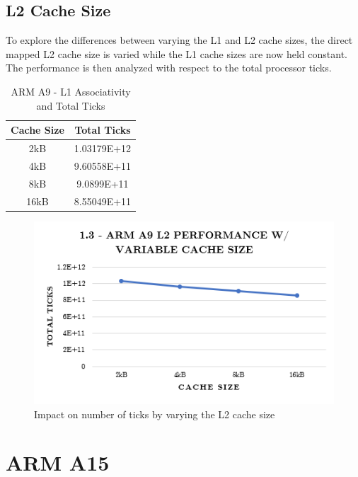 \documentclass[a4paper, 10pt, conference]{ieeeconf}      %
\begin{document}
\subsection{L2 Cache Size}

To explore the differences between varying the L1 and L2 cache sizes, the direct mapped L2 cache size is varied while the L1 cache sizes are now held constant. The performance is then analyzed with respect to the total processor ticks.


\begin{table}[h]
\caption{ARM A9 - L1 Associativity and Total Ticks}
\label{table_example}
\begin{center}
\begin{tabular}{|c||c|}
\hline
Cache Size & Total Ticks\\
\hline
2kB
 & 1.03179E+12
\\
\hline
4kB
 & 9.60558E+11
\\
\hline
8kB
 & 9.0899E+11
\\
\hline
16kB
 & 8.55049E+11
\\
\hline
\end{tabular}
\end{center}
\end{table}

\begin{figure}[thpb]
\centering
\includegraphics[scale=.5]{ex1_3.png}
\caption{Impact on number of ticks by varying the L2 cache size}
\label{figurelabel}
\end{figure}

\pagebreak

\section{ARM A15}
\end{document}
